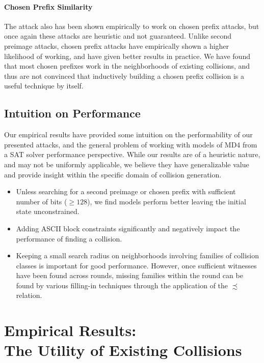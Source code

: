 \documentclass[conference]{IEEEtran}
\begin{document}
\paragraph{Chosen Prefix Similarity}

The attack also has been shown empirically to work on chosen prefix
attacks, but once again these attacks are heuristic and not
guaranteed.  Unlike second preimage attacks, chosen prefix attacks
have empirically shown a higher likelihood
of working, and have given better results in practice. We have found that most chosen
prefixes work in the neighborhoods of existing collisions, and thus are not
convinced that inductively building a chosen prefix collision is a useful
technique by itself.


\subsection{Intuition on Performance}

Our empirical results have provided some intuition on the
performability of our presented attacks, and the general problem of
working with models of MD4 from a SAT solver
performance perspective.  While our results are of a heuristic nature,
and may not be uniformly applicable, we believe they have
generalizable value and provide insight within the specific domain of
collision generation.

\begin{itemize}
    \item Unless searching for a second preimage or chosen prefix with
        sufficient number of bits ($\geq 128$), we find models perform better
        leaving the initial state unconstrained.
    \item Adding ASCII block constraints significantly and negatively impact
        the performance of finding a collision.
    \item Keeping a small search radius on neighborhoods involving families
        of collision classes is important for good performance. However,
        once sufficient witnesses have been found across rounds, missing
        families within the round can be found by various filling-in
        techniques through the application of the $\precsim$ relation.
\end{itemize}

\section{Empirical Results:\\The Utility of Existing Collisions}
\label{Sec:Empirical}
\end{document}

